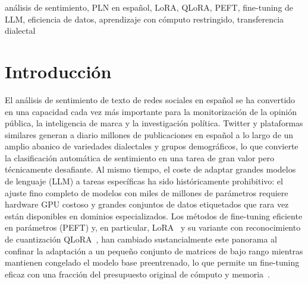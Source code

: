 \documentclass[conference]{IEEEtran}
\begin{document}

\begin{IEEEkeywords}
análisis de sentimiento, PLN en español, LoRA, QLoRA, PEFT,
fine-tuning de LLM, eficiencia de datos, aprendizaje con cómputo restringido,
transferencia dialectal
\end{IEEEkeywords}


\section{Introducción}
\label{sec:introduction}

El análisis de sentimiento de texto de redes sociales en español se ha
convertido en una capacidad cada vez más importante para la monitorización de
la opinión pública, la inteligencia de marca y la investigación política.
Twitter y plataformas similares generan a diario millones de publicaciones en
español a lo largo de un amplio abanico de variedades dialectales y grupos
demográficos, lo que convierte la clasificación automática de sentimiento en
una tarea de gran valor pero técnicamente desafiante.
Al mismo tiempo, el coste de adaptar grandes modelos de lenguaje (LLM) a tareas
específicas ha sido históricamente prohibitivo: el ajuste fino completo de
modelos con miles de millones de parámetros requiere hardware GPU costoso y
grandes conjuntos de datos etiquetados que rara vez están disponibles en
dominios especializados.
Los métodos de fine-tuning eficiente en parámetros (PEFT) y, en particular,
LoRA~\cite{hu2021lora} y su variante con reconocimiento de cuantización
QLoRA~\cite{dettmers2023qlora}, han cambiado sustancialmente este panorama al
confinar la adaptación a un pequeño conjunto de matrices de bajo rango mientras
mantienen congelado el modelo base preentrenado, lo que permite un fine-tuning
eficaz con una fracción del presupuesto original de cómputo y
memoria~\cite{ding2023peftsurvey}.
\end{document}
